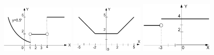 \begin{figure}%
\begin{floatrow}[3]
{\includegraphics[width=0.32\textwidth,keepaspectratio]{img/ris_3_45}}
{\includegraphics[width=0.32\textwidth,keepaspectratio]{img/ris_3_46}}
{\includegraphics[width=0.32\textwidth,keepaspectratio]{img/ris_3_47}}
\end{floatrow}
\end{figure}%

